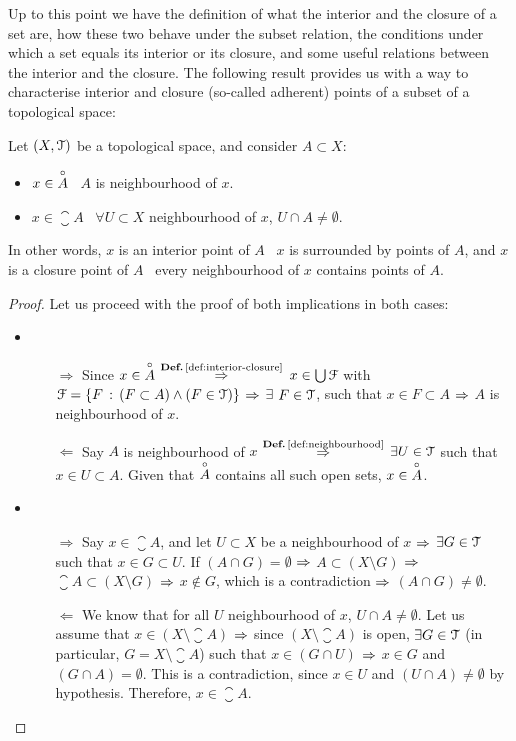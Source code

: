 Up to this point we have the definition of what the interior and the closure of a set are, how these two behave under the subset relation, the conditions under which a set equals its interior or its closure, and some useful relations between the interior and the closure. The following result provides us with a way to characterise interior and closure (so-called adherent) points of a subset of a topological space:

\begin{lemma}
	\label{lem:interior-closure-points}
	Let $(X,\EuScript{T})$ be a topological space, and consider $A\subset X$:
	\begin{itemize}
		\item $x\in\overset{\circ}{A}$ \iff\ $A$ is neighbourhood of $x$.
		\item $x\in\closure{A}$ \iff\ $\forall U\subset X$ neighbourhood of $x$, $U\cap A\neq\emptyset$.
	\end{itemize}
\end{lemma}
In other words, $x$ is an interior point of $A$ \iff\ $x$ is surrounded by points of $A$, and $x$ is a closure point of $A$ \iff\ every neighbourhood of $x$ contains points of $A$.

\begin{proof}
	Let us proceed with the proof of both implications in both cases:
	\begin{itemize}
		\item \begin{itemize}
				  \item[$\boxed{\Rightarrow}$] Since $x\in\overset{\circ}{A}$ $\overset{\defref{def:interior-closure}}{\Then}$ $x\in\bigcup\EuScript{F}$ with $\EuScript{F}=\left\{F\,:\,(F\subset A) \land (F\in\EuScript{T})\right\}$ $\Rightarrow$ $\exists$ $F\in \EuScript{T}$, such that $x\in F\subset A$ $\Rightarrow$ $A$ is neighbourhood of $x$.
				  \item[$\boxed{\Leftarrow}$] Say $A$ is neighbourhood of $x$ $\overset{\defref{def:neighbourhood}}{\Then}$ $\exists U\in\EuScript{T}$ such that $x\in U\subset A$. Given that $\overset{\circ}{A}$ contains all such open sets, $x\in\overset{\circ}{A}$.
		\end{itemize}
		\item \begin{itemize}
				  \item[$\boxed{\Rightarrow}$] Say $x\in\closure{A}$, and let $U\subset X$ be a neighbourhood of $x$ $\Rightarrow$ $\exists G\in \EuScript{T}$ such that $x\in G\subset U$. If $(A\cap G)=\emptyset$ $\Rightarrow$ $A\subset (X\setminus G)$ $\Rightarrow$ $\closure{A}\subset(X\setminus G)$ $\Rightarrow$ $x\not\in G$, which is a contradiction $\Rightarrow$ $(A\cap G)\neq\emptyset$.
				  \item[$\boxed{\Leftarrow}$] We know that for all $U$ neighbourhood of $x$, $U\cap A\neq \emptyset$. Let us assume that $x\in(X\setminus \closure{A})$ $\Rightarrow$ since $(X\setminus \closure{A})$ is open, $\exists G\in\EuScript{T}$ (in particular, $G=X\setminus \closure{A}$) such that $x\in (G\cap U)$ $\Rightarrow$ $x\in G$ and $(G\cap A)=\emptyset$. This is a contradiction, since $x\in U$ and $(U\cap A)\neq\emptyset$ by hypothesis. Therefore, $x\in\closure{A}$.
		\end{itemize}
	\end{itemize}
\end{proof}

